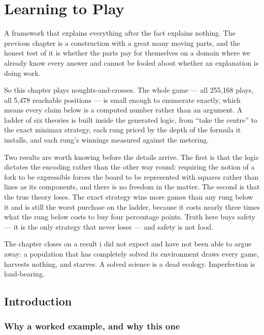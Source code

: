 \chapter{Learning to Play}
\label{ch:gam}

\noindent
A framework that explains everything after the fact explains nothing. The
previous chapter is a construction with a great many moving parts, and the
honest test of it is whether the parts pay for themselves on a domain where
we already know every answer and cannot be fooled about whether an
explanation is doing work.

So this chapter plays noughts-and-crosses. The whole game --- all 255{,}168
plays, all 5{,}478 reachable positions --- is small enough to enumerate
exactly, which means every claim below is a computed number rather than an
argument. A ladder of six theories is built inside the generated logic,
from ``take the centre'' to the exact minimax strategy, each rung priced by
the depth of the formula it installs, and each rung's winnings measured
against the metering.

Two results are worth knowing before the details arrive. The first is that
the logic dictates the encoding rather than the other way round: requiring
the notion of a fork to be expressible forces the board to be represented
with squares rather than lines as its components, and there is no freedom
in the matter. The second is that the true theory loses. The exact strategy
wins more games than any rung below it and is still the worst purchase on
the ladder, because it costs nearly three times what the rung below costs to
buy four percentage points. Truth here buys safety --- it is the only
strategy that never loses --- and safety is not food.

The chapter closes on a result i did not expect and have not been able to
argue away: a population that has completely solved its environment draws
every game, harvests nothing, and starves. A solved science is a dead
ecology. Imperfection is load-bearing.

\bigskip

\section{Introduction}\label{gam:S1}

\subsection{Why a worked example, and why this one}\label{gam:S1.1}

